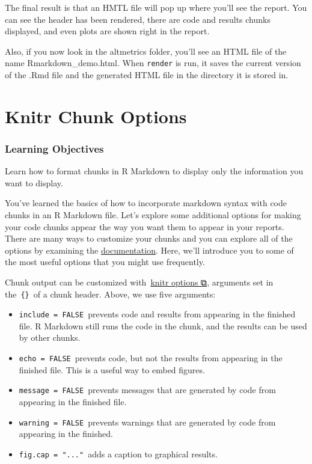 \documentclass[
]{book}
\providecommand{\tightlist}{%
  \setlength{\itemsep}{0pt}\setlength{\parskip}{0pt}}
\begin{document}
The final result is that an HMTL file will pop up where you'll see the report. You can see the header has been rendered, there are code and results chunks displayed, and even plots are shown right in the report.

Also, if you now look in the altmetrics folder, you'll see an HTML file of the name Rmarkdown\_demo.html. When \texttt{render} is run, it saves the current version of the .Rmd file and the generated HTML file in the directory it is stored in.

\hypertarget{knitr-chunk-options}{%
\section{Knitr Chunk Options}\label{knitr-chunk-options}}

\hypertarget{learning-objectives-4}{%
\subsubsection*{Learning Objectives}\label{learning-objectives-4}}

Learn how to format chunks in R Markdown to display only the information you want to display.

You've learned the basics of how to incorporate markdown syntax with code chunks in an R Markdown file. Let's explore some additional options for making your code chunks appear the way you want them to appear in your reports. There are many ways to customize your chunks and you can explore all of the options by examining the \href{http://yihui.name/knitr/options/\#chunk_options}{documentation}. Here, we'll introduce you to some of the most useful options that you might use frequently.

Chunk output can be customized with~\href{http://yihui.name/knitr/options/}{knitr options ⧉}, arguments set in the~\texttt{\{\}}~of a chunk header. Above, we use five arguments:

\begin{itemize}
\tightlist
\item
  \texttt{include\ =\ FALSE}~prevents code and results from appearing in the finished file. R Markdown still runs the code in the chunk, and the results can be used by other chunks.
\item
  \texttt{echo\ =\ FALSE}~prevents code, but not the results from appearing in the finished file. This is a useful way to embed figures.
\item
  \texttt{message\ =\ FALSE}~prevents messages that are generated by code from appearing in the finished file.
\item
  \texttt{warning\ =\ FALSE}~prevents warnings that are generated by code from appearing in the finished.
\item
  \texttt{fig.cap\ =\ "..."}~adds a caption to graphical results.
\end{itemize}
\end{document}

